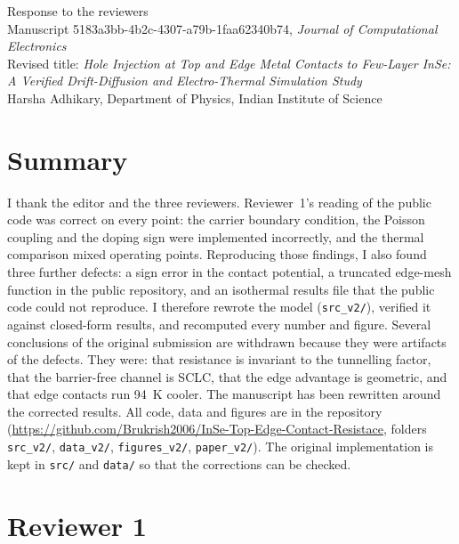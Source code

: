 \documentclass[11pt]{article}
\begin{document}
\begin{center}
{\Large Response to the reviewers}\\[4pt]
Manuscript 5183a3bb-4b2c-4307-a79b-1faa62340b74, \textit{Journal of Computational Electronics}\\
Revised title: \textit{Hole Injection at Top and Edge Metal Contacts to Few-Layer InSe: A Verified Drift-Diffusion and Electro-Thermal Simulation Study}\\
Harsha Adhikary, Department of Physics, Indian Institute of Science
\end{center}

\section*{Summary}
I thank the editor and the three reviewers. Reviewer~1's reading of the public code was correct on every point: the carrier boundary condition, the Poisson coupling and the doping sign were implemented incorrectly, and the thermal comparison mixed operating points. Reproducing those findings, I also found three further defects: a sign error in the contact potential, a truncated edge-mesh function in the public repository, and an isothermal results file that the public code could not reproduce. I therefore rewrote the model (\texttt{src\_v2/}), verified it against closed-form results, and recomputed every number and figure. Several conclusions of the original submission are withdrawn because they were artifacts of the defects. They were: that resistance is invariant to the tunnelling factor, that the barrier-free channel is SCLC, that the edge advantage is geometric, and that edge contacts run 94~K cooler. The manuscript has been rewritten around the corrected results. All code, data and figures are in the repository (\url{https://github.com/Brukrish2006/InSe-Top-Edge-Contact-Resistace}, folders \texttt{src\_v2/}, \texttt{data\_v2/}, \texttt{figures\_v2/}, \texttt{paper\_v2/}). The original implementation is kept in \texttt{src/} and \texttt{data/} so that the corrections can be checked.

\section*{Reviewer 1}
\end{document}
